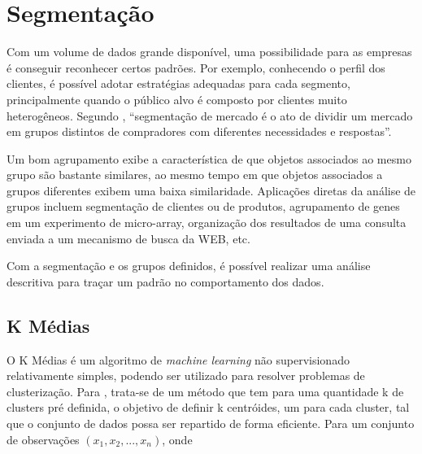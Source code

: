 \section{Segmentação}


Com um volume de dados grande disponível, uma possibilidade para as empresas é conseguir reconhecer certos padrões. Por exemplo, conhecendo o perfil dos clientes, é possível adotar estratégias adequadas para cada segmento, principalmente quando o público alvo é composto por clientes muito heterogêneos. Segundo , ``segmentação de mercado é o ato de dividir um mercado em grupos distintos de compradores com diferentes necessidades e respostas''.

\begin{citacao} 
Um bom agrupamento exibe a característica de que objetos associados ao mesmo grupo são bastante similares, ao mesmo tempo em que objetos associados a grupos diferentes exibem uma baixa similaridade. Aplicações diretas da análise de grupos incluem segmentação de clientes ou de produtos, agrupamento de genes em um experimento de micro-array, organização dos resultados de uma consulta enviada a um mecanismo de busca da WEB, etc.
\cite{BEZERRA} \end{citacao}

Com a segmentação e os grupos definidos, é possível realizar uma análise descritiva para traçar um padrão no comportamento dos dados. 

\subsection{K Médias}

O K Médias é um algoritmo de \emph{machine learning} não supervisionado relativamente simples, podendo ser utilizado para resolver problemas de clusterização. Para , trata-se de um método que tem para uma quantidade k de clusters pré definida, o objetivo de definir k centróides\footnotemark {}, um para cada cluster, tal que o conjunto de dados possa ser repartido de forma eficiente. Para um conjunto de observações \begin{math}(x_{1}, x_{2}, ..., x_{n})\end{math}, onde 

